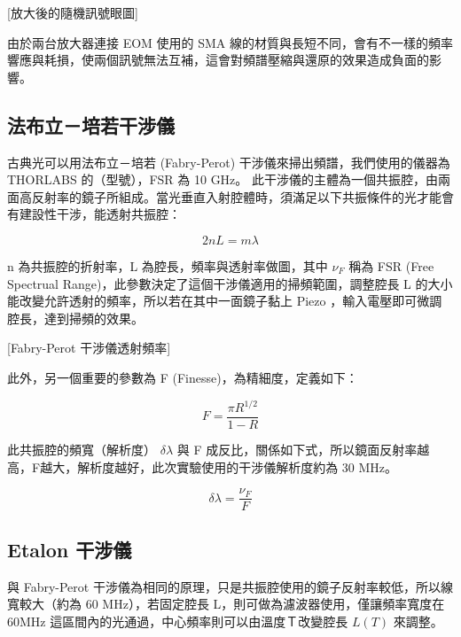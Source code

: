 \documentclass[class=NCU_thesis, crop=false]{standalone}
\begin{document}
[放大後的隨機訊號眼圖]

由於兩台放大器連接 EOM 使用的 SMA 線的材質與長短不同，會有不一樣的頻率響應與耗損，使兩個訊號無法互補，這會對頻譜壓縮與還原的效果造成負面的影響。

\subsection{法布立－培若干涉儀}
古典光可以用法布立－培若 (Fabry-Perot) 干涉儀來掃出頻譜，我們使用的儀器為 THORLABS 的（型號），FSR 為 10 GHz。
此干涉儀的主體為一個共振腔，由兩面高反射率的鏡子所組成。當光垂直入射腔體時，須滿足以下共振條件的光才能會有建設性干涉，能透射共振腔：

\begin{equation}
    2nL=m\lambda
\end{equation}

n 為共振腔的折射率，L 為腔長，頻率與透射率做圖，其中 $\nu_{F}$ 稱為 FSR (Free Spectrual Range)，此參數決定了這個干涉儀適用的掃頻範圍，調整腔長 L 的大小能改變允許透射的頻率，所以若在其中一面鏡子黏上 Piezo ，輸入電壓即可微調腔長，達到掃頻的效果。

[Fabry-Perot 干涉儀透射頻率]

此外，另一個重要的參數為 F (Finesse)，為精細度，定義如下：

\begin{equation}
    F=\frac{\pi R^{1/2}}{1-R}
\end{equation}

此共振腔的頻寬（解析度） $\delta \lambda$ 與 F 成反比，關係如下式，所以鏡面反射率越高，F越大，解析度越好，此次實驗使用的干涉儀解析度約為 30 MHz。

\begin{equation}
    \delta \lambda=\frac{\nu_{F}}{F}
\end{equation}

\subsection{Etalon 干涉儀}
與 Fabry-Perot 干涉儀為相同的原理，只是共振腔使用的鏡子反射率較低，所以線寬較大（約為 60 MHz），若固定腔長 L，則可做為濾波器使用，僅讓頻率寬度在 60MHz 這區間內的光通過，中心頻率則可以由溫度Ｔ改變腔長 $L(T)$ 來調整。
\end{document}
